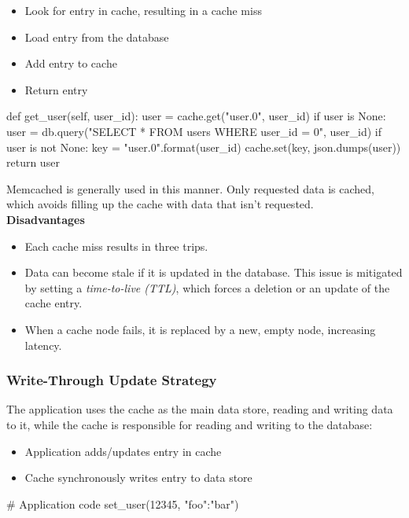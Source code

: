 \documentclass[12pt, titlepage]{article}
\begin{document}
\begin{itemize}
  \item Look for entry in cache, resulting in a cache miss
  \item Load entry from the database
  \item Add entry to cache
  \item Return entry
\end{itemize}

\begin{python}
def get_user(self, user_id):
    user = cache.get("user.{0}", user_id)
    if user is None:
        user = db.query("SELECT * FROM users WHERE user_id = {0}", user_id)
        if user is not None:
            key = "user.{0}".format(user_id)
            cache.set(key, json.dumps(user))
    return user
\end{python}

Memcached is generally used in this manner. Only requested data is cached, which avoids filling up the cache with data that isn't requested. \\

\textbf{Disadvantages}
\begin{itemize}
  \item Each cache miss results in three trips.
  \item Data can become stale if it is updated in the database. This issue is mitigated by setting a \textit{time-to-live (TTL)}, which forces a deletion or an update of the cache entry.
  \item When a cache node fails, it is replaced by a new, empty node, increasing latency.
\end{itemize}

\subsubsection{Write-Through Update Strategy}

The application uses the cache as the main data store, reading and writing data to it, while the cache is responsible for reading and writing to the database:

\begin{itemize}
  \item Application adds/updates entry in cache
  \item Cache synchronously writes entry to data store
\end{itemize}

\begin{python}
# Application code
set_user(12345, {"foo":"bar"})
\end{python}
\end{document}
